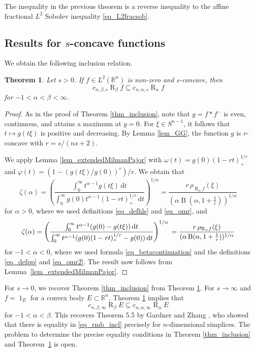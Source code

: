\documentclass{amsart}
\newtheorem{theorem}{Theorem}
\newcommand{\omr}[1]{\operatorname{R}_{#1}\!}
\newcommand{\R}{\mathbb R}
\newcommand{\Beta}{\operatorname{B}}
\renewcommand{\d}{\,\mathrm{d}}
\newcommand{\pl}[1]{#1_{\scriptscriptstyle +}}
\renewcommand{\chi}{\operatorname{1}}
\begin{document}
\noindent
The inequality in the previous theorem is a reverse inequality to the affine fractional $L^2$ Sobolev inequality \eqref{eq_L2fracsob}.


\goodbreak
\subsection{Results for $s$-concave functions}
We obtain the following inclusion relation.
\begin{theorem}\label{thm_inclusion_s}
Let  $s>0$. 
If  $f\in L^2(\R^n)$ is non-zero and $s$-concave, then
\[c_{n,\beta,s} \omr \beta f\subseteq  
c_{n,\alpha,s} \omr \alpha f
\] 
for $-1<\alpha<\beta<\infty$.
\end{theorem}

\begin{proof}
As in the proof of Theorem \ref{thm_inclusion}, note that $g=f*f^-$ is even, continuous, and attains a maximum at $y=0$. For $\xi \in S^{n-1}$, it follows that $t\mapsto g(t \xi)$ is positive and decreasing. By Lemma \ref{lem_GG}, the function $g$ is $r$-concave with $r={s}/{( ns + 2)}$.


We apply Lemma \ref{lem_extendedMilmanPajor} with $\omega(t) = g(0) \pl{(1-rt)}^{1/r}$ and $\varphi(t)=(1-(g(t\xi)/g(0))^r)/r$. 
We obtain that
\[    \zeta(\alpha) 
    = \left(\frac{\int_0^\infty t^{\alpha-1}g(t\xi) \d t}{\int_0^\infty g(0) t^{\alpha-1} \pl{(1-rt)}^{1/r} \d t} \right)^{1/\alpha}
    = \frac{r \,\rho_{\omr \alpha f}(\xi)}{(\alpha \Beta(\alpha, 1+\frac1r))^{1/\alpha}}
\]
for $\alpha>0$, where we used definitions \eqref{eq_defhls} and \eqref{eq_omr}, and
\[
\zeta(\alpha) 
    = \left(\frac{\int_0^\infty t^{\alpha-1}(g(0) - g(t\xi)) \d t}{\int_0^\infty t^{\alpha-1} (g(0) \pl{(1-rt)}^{1/r} - g(0)) \d t} \right)^{1/\alpha}\\
    = \frac{r\,\rho_{\omr \alpha f}(\xi)}{(\alpha\Beta(\alpha,1+\frac1r)) ^{1/\alpha}}
\]
for $-1<\alpha<0$, where we used formula \eqref{eq_betacontinuation} and the definitions \eqref{eq_defpp} and \eqref{eq_omr2}. The result now follows from Lemma~\ref{lem_extendedMilmanPajor}.
\end{proof}


\goodbreak
For $s\to 0$, we recover Theorem \ref{thm_inclusion} from Theorem \ref{thm_inclusion_s}. For $s\to\infty$ and $f=\chi_E$ for a convex body $E\subset\R^n$, Theorem \ref{thm_inclusion_s} implies that
\begin{equation}\label{eq_rmb_incl}
c_{n,\beta,\infty} \omr \beta E\subseteq  
c_{n,\alpha,\infty} \omr \alpha E
\end{equation}
for $-1<\alpha<\beta$.
This recovers  Theorem 5.5  by Gardner and Zhang \cite{GZ},
who showed that there is equality in \eqref{eq_rmb_incl} precisely for $n$-dimensional simplices. The problem to determine the precise equality conditions in Theorem \ref{thm_inclusion} and Theorem~\ref{thm_inclusion_s} is open. 
\end{document}
